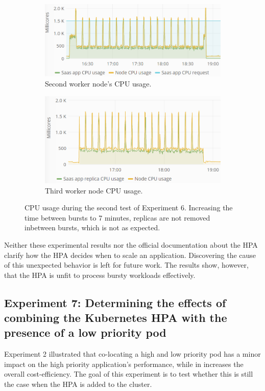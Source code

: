 \begin{figure}
\centering
\begin{subfigure}[b]{\columnwidth}
\centering
\includegraphics[width=0.70\columnwidth]{Images/Experiments/CPU/Grafana/cpu-saas-hpa-bursty-3-1.PNG}
\caption{Second worker node's CPU usage.}
\label{fig:cpu-saas-hpa-bursty-3-1}
\end{subfigure}
\hfill
\begin{subfigure}[b]{\columnwidth}
\centering
\includegraphics[width=0.70\columnwidth]{Images/Experiments/CPU/Grafana/cpu-saas-hpa-bursty-3-2.PNG}
\caption{Third worker node CPU usage.}
\label{fig:cpu-saas-hpa-bursty-3-2}
\end{subfigure}
\hfill
\vspace*{-7mm}
\caption{CPU usage during the second test of Experiment 6. Increasing the time between bursts to 7 minutes, replicas are not removed inbetween bursts, which is not as expected.}
\label{fig:cpu-saas-hpa-bursty-2}
\end{figure}

Neither these experimental results nor the official documentation about the HPA~\citep{hpa-algorithm-details} clarify how the HPA decides when to scale an application. Discovering the cause of this unexpected behavior is left for future work. The results show, however, that the HPA is unfit to process bursty workloads effectively.


\subsection{Experiment 7: Determining the effects of combining the Kubernetes HPA with the presence of a low priority pod}
Experiment 2 illustrated that co-locating a high and low priority pod has a minor impact on the high priority application's performance, while in increases the overall cost-efficiency. The goal of this experiment is to test whether this is still the case when the HPA is added to the cluster. 

